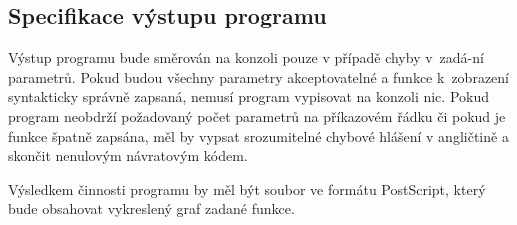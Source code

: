 \documentclass[../main.tex]{subfiles}
\begin{document}
\subsection{Specifikace výstupu programu}
Výstup programu bude směrován na konzoli pouze v případě chyby v~zadá-ní parametrů. Pokud
budou všechny parametry akceptovatelné a funkce k~zobrazení syntakticky správně zapsaná, nemusí program vypisovat na konzoli nic. Pokud program neobdrží požadovaný počet parametrů na
příkazovém řádku či pokud je funkce špatně zapsána, měl by vypsat srozumitelné chybové hlášení
v angličtině a skončit nenulovým návratovým kódem.
\begin{table}[h!]
    \centering
    \renewcommand{\arraystretch}{1.2} %
    \setlength{\tabcolsep}{4pt} %
    \caption{Chybové stavy a návratové hodnoty funkce}
\end{table}
\vspace{0.5em}

Výsledkem činnosti programu by měl být soubor ve formátu PostScript, který bude obsahovat
vykreslený graf zadané funkce.
\end{document}
